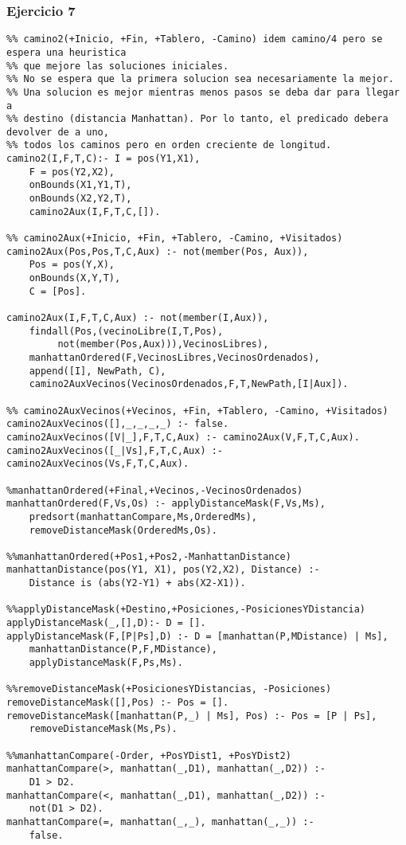 \subsubsection*{Ejercicio 7}
\begin{lstlisting}
%% camino2(+Inicio, +Fin, +Tablero, -Camino) idem camino/4 pero se espera una heuristica
%% que mejore las soluciones iniciales.
%% No se espera que la primera solucion sea necesariamente la mejor.
%% Una solucion es mejor mientras menos pasos se deba dar para llegar a
%% destino (distancia Manhattan). Por lo tanto, el predicado debera devolver de a uno,
%% todos los caminos pero en orden creciente de longitud.
camino2(I,F,T,C):- I = pos(Y1,X1),
	F = pos(Y2,X2),
	onBounds(X1,Y1,T),
	onBounds(X2,Y2,T),
	camino2Aux(I,F,T,C,[]).

%% camino2Aux(+Inicio, +Fin, +Tablero, -Camino, +Visitados)
camino2Aux(Pos,Pos,T,C,Aux) :- not(member(Pos, Aux)),
	Pos = pos(Y,X),
	onBounds(X,Y,T),
	C = [Pos].

camino2Aux(I,F,T,C,Aux) :- not(member(I,Aux)),
	findall(Pos,(vecinoLibre(I,T,Pos),
	     not(member(Pos,Aux))),VecinosLibres),
	manhattanOrdered(F,VecinosLibres,VecinosOrdenados),
	append([I], NewPath, C),
	camino2AuxVecinos(VecinosOrdenados,F,T,NewPath,[I|Aux]).

%% camino2AuxVecinos(+Vecinos, +Fin, +Tablero, -Camino, +Visitados)
camino2AuxVecinos([],_,_,_,_) :- false.
camino2AuxVecinos([V|_],F,T,C,Aux) :- camino2Aux(V,F,T,C,Aux).
camino2AuxVecinos([_|Vs],F,T,C,Aux) :- camino2AuxVecinos(Vs,F,T,C,Aux).

%manhattanOrdered(+Final,+Vecinos,-VecinosOrdenados)
manhattanOrdered(F,Vs,Os) :- applyDistanceMask(F,Vs,Ms),
	predsort(manhattanCompare,Ms,OrderedMs),
	removeDistanceMask(OrderedMs,Os).

%%manhattanOrdered(+Pos1,+Pos2,-ManhattanDistance)
manhattanDistance(pos(Y1, X1), pos(Y2,X2), Distance) :-
	Distance is (abs(Y2-Y1) + abs(X2-X1)).

%%applyDistanceMask(+Destino,+Posiciones,-PosicionesYDistancia)
applyDistanceMask(_,[],D):- D = [].
applyDistanceMask(F,[P|Ps],D) :- D = [manhattan(P,MDistance) | Ms],
	manhattanDistance(P,F,MDistance),
	applyDistanceMask(F,Ps,Ms).

%%removeDistanceMask(+PosicionesYDistancias, -Posiciones)
removeDistanceMask([],Pos) :- Pos = [].
removeDistanceMask([manhattan(P,_) | Ms], Pos) :- Pos = [P | Ps],
	removeDistanceMask(Ms,Ps).

%%manhattanCompare(-Order, +PosYDist1, +PosYDist2)
manhattanCompare(>, manhattan(_,D1), manhattan(_,D2)) :-
	D1 > D2.
manhattanCompare(<, manhattan(_,D1), manhattan(_,D2)) :-
	not(D1 > D2).
manhattanCompare(=, manhattan(_,_), manhattan(_,_)) :-
	false.

\end{lstlisting}
\vspace{1cm}

